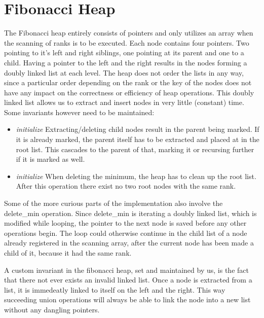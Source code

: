\section*{Fibonacci Heap}
The Fibonacci heap entirely consists of pointers and only utilizes an array when the scanning of ranks is to be executed.
Each node contains four pointers. Two pointing to it's left and right siblings, one pointing at its parent and one to a child.
Having a pointer to the left and the right results in the nodes forming a doubly linked list at each level. The heap does not order the lists in any way, since a particular order depending on the rank or the key of the nodes does not have any impact on the correctness or efficiency of heap operations.
This doubly linked list allows us to extract and insert nodes in very little (constant) time. Some invariants however need to be maintained:
\begin{itemize}
 \item{\em{initialize}} Extracting/deleting child nodes result in the parent being marked. If it is already marked, the parent itself has to be extracted and placed at in the root list. This cascades to the parent of that, marking it or recursing further if it is marked as well.
 \item{\em{initialize}} When deleting the minimum, the heap has to clean up the root list. After this operation there exist no two root nodes with the same rank.
\end{itemize}
Some of the more curious parts of the implementation also involve the delete\_min operation. Since delete\_min is iterating a doubly linked list, which is modified while looping, the pointer to the next node is saved before any other operations begin. The loop could otherwise continue in the child list of a node already registered in the scanning array, after the current node has been made a child of it, because it had the same rank.

A custom invariant in the fibonacci heap, set and maintained by us, is the fact that there not ever exists an invalid linked list. Once a node is extracted from a list, it is immedeatly linked to itself on the left and the right. This way succeeding union operations will always be able to link the node into a new list without any dangling pointers.

